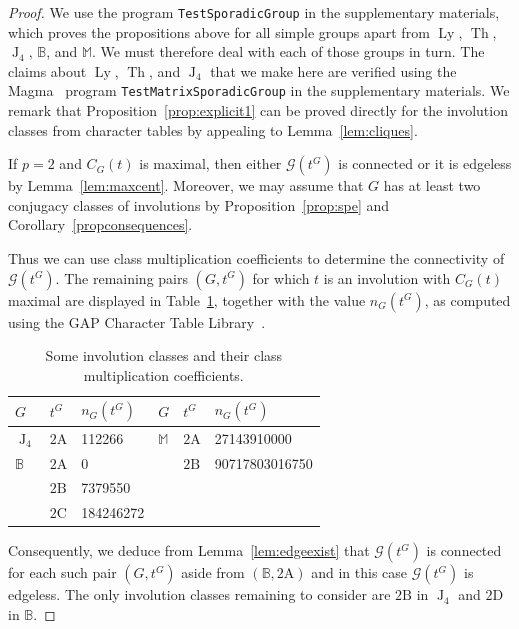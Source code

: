 \documentclass[11pt,a4paper]{amsart}
\theoremstyle{plain}
\theoremstyle{definition}
\theoremstyle{remark}
\newcounter{claim}[definition]
\theoremstyle{remark}
\theoremstyle{remark}
\theoremstyle{definition}
\newcommand{\GG}{\mathcal{G}}
\newcommand{\BM}{\mathbb{B}}
\newcommand{\MM}{\mathbb{M}}
\DeclareMathOperator{\Ly}{Ly}
\DeclareMathOperator{\J}{J}
\DeclareMathOperator{\Th}{Th}
\begin{document}
\begin{proof} We use the program \texttt{TestSporadicGroup} in the supplementary materials, which proves the propositions above for all simple groups apart from $\Ly$, $\Th$, $\J_4$, $\BM$, and $\MM$. We must therefore deal with each of those groups in turn. The claims about $\Ly$, $\Th$, and $\J_4$ that we make here are verified using the {\sc Magma}~\cite{magma} program \texttt{TestMatrixSporadicGroup} in the supplementary materials. We remark that Proposition~\ref{prop:explicit1} can be proved directly for the involution classes from character tables by appealing to Lemma~\ref{lem:cliques}.

If $p=2$ and $C_G(t)$ is maximal, then either $\GG(t^G)$ is connected or it is edgeless by Lemma~\ref{lem:maxcent}. Moreover, we may assume that $G$ has at least two conjugacy classes of involutions by Proposition~\ref{prop:spe} and Corollary~\ref{propconsequences}.

Thus we can use class multiplication coefficients to determine the connectivity of $\GG(t^G)$. The remaining pairs $(G,t^G)$ for which $t$ is an involution with $C_G(t)$ maximal are displayed in Table~\ref{tbl:maxcent}, together with the value $n_G(t^G)$, as computed using the {\sf GAP} Character Table Library~\cite{CTblLib1.3.11}.
\begin{table}[ht]
    \begin{center}
    \begin{tabular}{|lll|lll|}\hline
    $G$ & $t^G$ & $n_G(t^G)$&$G$ & $t^G$ & $n_G(t^G)$\\
    \hline
    $\J_4$ & $\mathrm{2A}$ & 112266&$\MM$   & $\mathrm{2A}$ & 27143910000\\
     $\BM$   & $\mathrm{2A}$ & 0&&$\mathrm{2B}$ & 90717803016750\\
       & $\mathrm{2B}$ & 7379550&&&\\
                   & $\mathrm{2C}$ & 184246272&&& \\ \hline \end{tabular}\end{center}
\caption{Some involution classes and their class multiplication coefficients.}
\label{tbl:maxcent}
\end{table}
Consequently, we deduce from Lemma~\ref{lem:edgeexist} that $\GG(t^G)$ is connected for each such pair $(G,t^G)$ aside from $(\BM,\mathrm{2A})$ and in this case $\GG(t^G)$ is edgeless. The only involution classes remaining to consider are $\mathrm{2B}$ in $\J_4$ and $\mathrm{2D}$ in $\BM$.


\end{proof}
\end{document}
